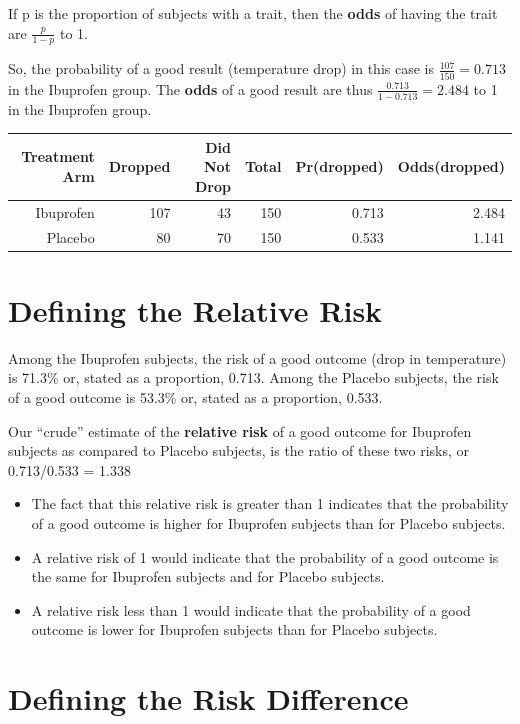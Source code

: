 \documentclass[
]{book}
\providecommand{\tightlist}{%
  \setlength{\itemsep}{0pt}\setlength{\parskip}{0pt}}
\begin{document}
If p is the proportion of subjects with a trait, then the \textbf{odds} of having the trait are \(\frac{p}{1-p}\) to 1.

So, the probability of a good result (temperature drop) in this case is \(\frac{107}{150} = 0.713\) in the Ibuprofen group. The \textbf{odds} of a good result are thus \(\frac{0.713}{1 - 0.713} = 2.484\) to 1 in the Ibuprofen group.

\begin{longtable}[]{@{}rrrrrr@{}}
\toprule
Treatment Arm & Dropped & Did Not Drop & Total & Pr(dropped) & Odds(dropped)\tabularnewline
\midrule
\endhead
Ibuprofen & 107 & 43 & 150 & 0.713 & 2.484\tabularnewline
Placebo & 80 & 70 & 150 & 0.533 & 1.141\tabularnewline
\bottomrule
\end{longtable}

\hypertarget{defining-the-relative-risk}{%
\section{Defining the Relative Risk}\label{defining-the-relative-risk}}

Among the Ibuprofen subjects, the risk of a good outcome (drop in temperature) is 71.3\% or, stated as a proportion, 0.713. Among the Placebo subjects, the risk of a good outcome is 53.3\% or, stated as a proportion, 0.533.

Our ``crude'' estimate of the \textbf{relative risk} of a good outcome for Ibuprofen subjects as compared to Placebo subjects, is the ratio of these two risks, or 0.713/0.533 = 1.338

\begin{itemize}
\tightlist
\item
  The fact that this relative risk is greater than 1 indicates that the probability of a good outcome is higher for Ibuprofen subjects than for Placebo subjects.
\item
  A relative risk of 1 would indicate that the probability of a good outcome is the same for Ibuprofen subjects and for Placebo subjects.
\item
  A relative risk less than 1 would indicate that the probability of a good outcome is lower for Ibuprofen subjects than for Placebo subjects.
\end{itemize}

\hypertarget{defining-the-risk-difference}{%
\section{Defining the Risk Difference}\label{defining-the-risk-difference}}
\end{document}
